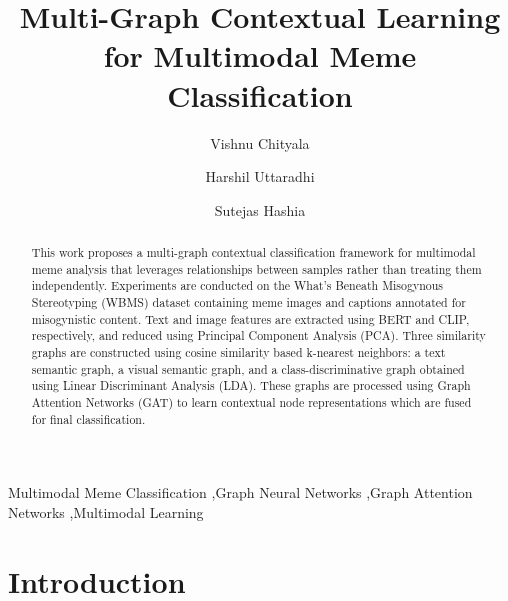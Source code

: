 \documentclass[a4paper]{cas-sc}
\begin{document}
\let\WriteBookmarks\relax
\def\floatpagepagefraction{.7}
\def\textpagefraction{.1}


\makeatletter
\def\printFirstPageNotes{}
\makeatother

\title[mode=title]{Multi-Graph Contextual Learning for Multimodal Meme Classification}

\author[1]{Vishnu Chityala}

\author[1]{Harshil Uttaradhi}

\author[1]{Sutejas Hashia}



\begin{abstract}
This work proposes a multi-graph contextual classification framework for multimodal meme analysis that leverages relationships between samples rather than treating them independently. Experiments are conducted on the What’s Beneath Misogynous Stereotyping (WBMS) dataset containing meme images and captions annotated for misogynistic content. Text and image features are extracted using BERT and CLIP, respectively, and reduced using Principal Component Analysis (PCA). Three similarity graphs are constructed using cosine similarity based k-nearest neighbors: a text semantic graph, a visual semantic graph, and a class-discriminative graph obtained using Linear Discriminant Analysis (LDA). These graphs are processed using Graph Attention Networks (GAT) to learn contextual node representations which are fused for final classification.
\end{abstract}

\begin{keywords}
Multimodal Meme Classification \sep Graph Neural Networks \sep Graph Attention Networks \sep Multimodal Learning
\end{keywords}

\maketitle

\section{Introduction}
\end{document}
